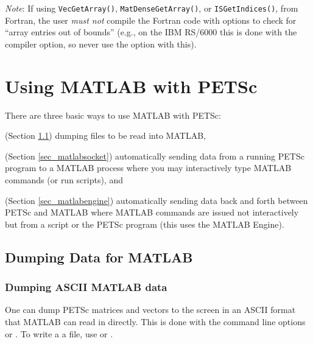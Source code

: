 {\em Note}: If using \lstinline{VecGetArray()}, \lstinline{MatDenseGetArray()}, or \lstinline{ISGetIndices()},
from Fortran, the user {\em must not} compile the Fortran code with options
to check for ``array entries out of bounds'' (e.g., on the IBM RS/6000 this
is done with the  compiler option, so never use the  option with this).


\cleardoublepage
\chapter{Using MATLAB with PETSc}
\label{ch_matlab}

There are three basic ways to use MATLAB with PETSc: 
\begin{tightenumerate}
  \item (Section \ref{sec_matlabdump}) dumping files to be read into MATLAB,
  \item (Section \ref{sec_matlabsocket}) automatically sending data from a running PETSc program
to a MATLAB process where you may interactively type MATLAB commands (or run
scripts), and 
\item (Section \ref{sec_matlabengine}) automatically sending data back and forth between PETSc and
MATLAB where MATLAB commands are issued not interactively but from a script or
the PETSc program (this uses the MATLAB Engine).
\end{tightenumerate}

\section{Dumping Data for MATLAB}
\label{sec_matlabdump}
\subsection{Dumping ASCII MATLAB data}
One can dump PETSc matrices and vectors to the screen in an ASCII format that MATLAB can read in directly. This is done with the
command line options  or . 
To write a a file, use  or .

